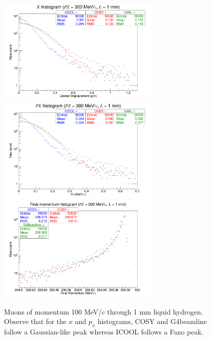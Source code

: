 \begin{figure}[H]
  \centering
    \includegraphics[width=0.7\textwidth]{Benchmarking/LH/X.300.1.png} 
    \includegraphics[width=0.7\textwidth]{Benchmarking/LH/PX.300.1.png} 
    \includegraphics[width=0.7\textwidth]{Benchmarking/LH/strag.300.1.png} 
  \caption[Muons of momentum 300 MeV/$c$ through 1 mm liquid hydrogen.]{Muons of momentum 100 MeV/$c$ through 1 mm liquid hydrogen. Observe that for the $x$ and $p_x$ histograms, COSY and G4beamline follow a Gaussian-like peak whereas ICOOL follows a Fano peak.}
  \label{fig:300.1}
\end{figure}


